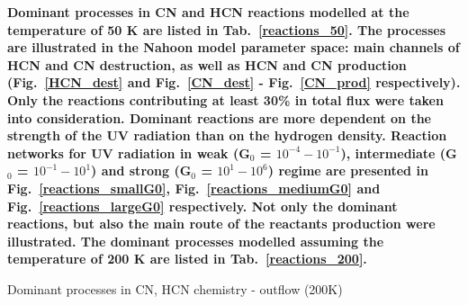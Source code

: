 \documentclass{aa}
\begin{document}
\begin{appendix}
\textbf{Dominant processes in CN and HCN reactions modelled at the temperature of 50 K are listed in Tab.~\ref{reactions_50}. The processes are illustrated in the Nahoon model parameter space: main channels of HCN and CN destruction, as well as HCN and CN production (Fig.~\ref{HCN_dest} and Fig.~\ref{CN_dest} - Fig.~\ref{CN_prod} respectively). Only the reactions contributing at least 30\% in total flux were taken into consideration. Dominant reactions are more dependent on the strength of the UV radiation than on the hydrogen density. Reaction networks for UV radiation in weak (G$_0$ = $10^{-4} - 10^{-1}$), intermediate (G$_0$ = $10^{-1} - 10^{1}$) and strong (G$_0$ = $10^{1} - 10^{6}$) regime are presented in Fig.~\ref{reactions_smallG0}, Fig.~\ref{reactions_mediumG0} and Fig.~\ref{reactions_largeG0} respectively. Not only the dominant reactions, but also the main route of the reactants production were illustrated. The dominant processes modelled assuming the temperature of 200 K are listed in Tab.~\ref{reactions_200}.}

\begin{table*} 
\caption{Dominant processes in CN, HCN chemistry - outflow (200K)}             %
\label{reactions_200}      %
               

\end{table*}
\end{appendix}
\end{document}
